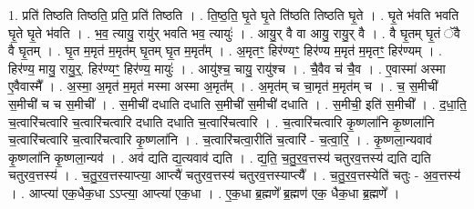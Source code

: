 \documentclass[17pt]{extarticle}
\begin{document}
1. प्रति॑ तिष्ठति तिष्ठति॒ प्रति॒ प्रति॑ तिष्ठति । . ति॒ष्ठ॒ति॒ घृ॒ते घृ॒ते ति॑ष्ठति तिष्ठति घृ॒ते । . घृ॒ते भ॑वति भवति घृ॒ते घृ॒ते भ॑वति । . भ॒व॒ त्यायु॒ रायु॑र् भवति भव॒ त्यायुः॑ । . आयु॒र् वै वा आयु॒ रायु॒र् वै । . वै घृ॒तम् घृ॒तं ॅवै वै घृ॒तम् । . घृ॒त म॒मृत॑ म॒मृत॑म् घृ॒तम् घृ॒त म॒मृत᳚म् । . अ॒मृतꣳ॒॒ हिर॑ण्यꣳ॒॒ हिर॑ण्य म॒मृत॑ म॒मृतꣳ॒॒ हिर॑ण्यम् । . हिर॑ण्य॒ मायु॒ रायु॒र्॒. हिर॑ण्यꣳ॒॒ हिर॑ण्य॒ मायुः॑ । . आयु॑श्च॒ चायु॒ रायु॑श्च । . चै॒वैव च॑ चै॒व । . ए॒वास्मा॑ अस्मा ए॒वैवास्मै᳚ । . अ॒स्मा॒ अ॒मृत॑ म॒मृत॑ मस्मा अस्मा अ॒मृत᳚म् । . अ॒मृत॑म् च चा॒मृत॑ म॒मृत॑म् च । . च॒ स॒मीची॑ स॒मीची॑ च च स॒मीची᳚ । . स॒मीची॑ दधाति दधाति स॒मीची॑ स॒मीची॑ दधाति । . स॒मीची॒ इति॑ स॒मीची᳚ । . द॒धा॒ति॒ च॒त्वारि॑चत्वारि च॒त्वारि॑चत्वारि दधाति दधाति च॒त्वारि॑चत्वारि । . च॒त्वारि॑चत्वारि कृ॒ष्णला॑नि कृ॒ष्णला॑नि च॒त्वारि॑चत्वारि च॒त्वारि॑चत्वारि कृ॒ष्णला॑नि । . च॒त्वारि॑चत्वा॒रीति॑ च॒त्वारि॑ - च॒त्वा॒रि॒ । . कृ॒ष्णला॒न्यवाव॑ कृ॒ष्णला॑नि कृ॒ष्णला॒न्यव॑ । . अव॑ द्यति द्य॒त्यवाव॑ द्यति । . द्य॒ति॒ च॒तु॒र॒व॒त्तस्य॑ चतुरव॒त्तस्य॑ द्यति द्यति चतुरव॒त्तस्य॑ । . च॒तु॒र॒व॒त्तस्याप्त्या॒ आप्त्यै॑ चतुरव॒त्तस्य॑ चतुरव॒त्तस्याप्त्यै᳚ । . च॒तु॒र॒व॒त्तस्येति॑ चतुः - अ॒व॒त्तस्य॑ । . आप्त्या॑ एक॒धैक॒धा ऽऽप्त्या॒ आप्त्या॑ एक॒धा । . ए॒क॒धा ब्र॒ह्मणे᳚ ब्र॒ह्मण॑ एक॒ धैक॒धा ब्र॒ह्मणे᳚ । \newline
\end{document}
